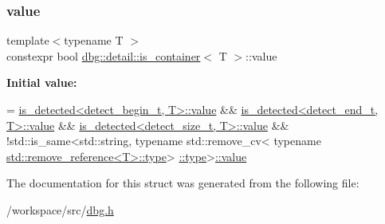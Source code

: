 \subsubsection{\texorpdfstring{value}{value}}
{\footnotesize\ttfamily template$<$typename T $>$ \\
constexpr bool \hyperlink{structdbg_1_1detail_1_1is__container}{dbg\+::detail\+::is\+\_\+container}$<$ T $>$\+::value\hspace{0.3cm}{\ttfamily [static]}}

{\bfseries Initial value\+:}
\begin{DoxyCode}
=
      \hyperlink{classis__detected}{is\_detected<detect\_begin\_t, T>::value} &&
      \hyperlink{classis__detected}{is\_detected<detect\_end\_t, T>::value} &&
      \hyperlink{classis__detected}{is\_detected<detect\_size\_t, T>::value} &&
      !std::is\_same<std::string,
                    \textcolor{keyword}{typename} std::remove\_cv<
                        \textcolor{keyword}{typename} \hyperlink{namespacedbg_a2365d80e3a3525e6025040383ff8661b}{std::remove\_reference<T>::type}>
      \hyperlink{namespacedbg_a2365d80e3a3525e6025040383ff8661b}{::type}>\hyperlink{structdbg_1_1detail_1_1is__container_aa9a4594488352384b65b36198ac414f8}{::value}
\end{DoxyCode}


The documentation for this struct was generated from the following file\+:\begin{DoxyCompactItemize}
\item 
/workspace/src/\hyperlink{dbg_8h}{dbg.\+h}\end{DoxyCompactItemize}
